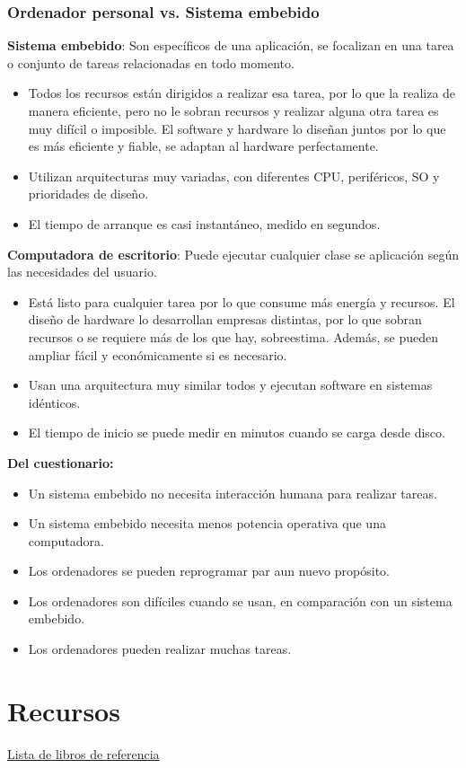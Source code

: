 \documentclass[12pt]{report} %
\begin{document}
\subsection{Ordenador personal vs. Sistema
embebido}

\textbf{Sistema embebido}: Son específicos de una aplicación, se
focalizan en una tarea o conjunto de tareas relacionadas en todo
momento.

\begin{itemize}

\item
  Todos los recursos están dirigidos a realizar esa tarea, por lo que la
  realiza de manera eficiente, pero no le sobran recursos y realizar alguna otra tarea es
  muy difícil o imposible. El software y hardware lo diseñan juntos por
  lo que es más eficiente y fiable, se adaptan al hardware
  perfectamente.
\item
  Utilizan arquitecturas muy variadas, con diferentes CPU, periféricos,
  SO y prioridades de diseño.
\item
  El tiempo de arranque es casi instantáneo, medido en segundos.
\end{itemize}

\textbf{Computadora de escritorio}: Puede ejecutar cualquier clase se
aplicación según las necesidades del usuario.

\begin{itemize}

\item
  Está listo para cualquier tarea por lo que consume más energía y
  recursos. El diseño de hardware lo desarrollan empresas distintas, por
  lo que sobran recursos o se requiere más de los que hay, sobreestima.
  Además, se pueden ampliar fácil y económicamente si es necesario.
\item
  Usan una arquitectura muy similar todos y ejecutan software en
  sistemas idénticos.
\item
  El tiempo de inicio se puede medir en minutos cuando se carga desde
  disco.
\end{itemize}

\textbf{Del cuestionario:}

\begin{itemize}

\item
  Un sistema embebido no necesita interacción humana para realizar
  tareas.
\item
  Un sistema embebido necesita menos potencia operativa que una
  computadora.
\item
  Los ordenadores se pueden reprogramar par aun nuevo propósito.
\item
  Los ordenadores son difíciles cuando se usan, en comparación con un
  sistema embebido.
\item
  Los ordenadores pueden realizar muchas tareas.
\end{itemize}

\chapter{Recursos}
\href{https://learning.oreilly.com/playlists/5a6c045f-e39c-465e-9e7c-60dcbb12aebb}{Lista de libros de referencia}
%
\end{document}
